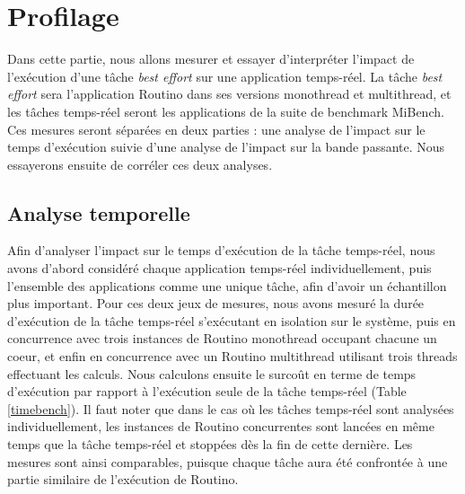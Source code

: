 \section{Profilage}

Dans cette partie, nous allons mesurer et essayer d'interpréter l'impact de 
l'exécution d'une tâche \textit{best effort} sur une application temps-réel.
La tâche \textit{best effort} sera l'application Routino dans ses versions
monothread et multithread, et les tâches temps-réel seront les applications de
la suite de benchmark MiBench\cite{guthaus_mibench:_2001}. Ces mesures seront
séparées en deux parties : une analyse de l'impact sur le temps d'exécution
suivie d'une analyse de l'impact sur la bande passante. Nous essayerons ensuite
de corréler ces deux analyses.

\subsection{Analyse temporelle}
Afin d'analyser l'impact sur le temps d'exécution de la tâche temps-réel, nous
avons d'abord considéré chaque application temps-réel individuellement, puis
l'ensemble des applications comme une unique tâche, afin d'avoir un échantillon
plus important. Pour ces deux jeux de mesures, nous avons mesuré la durée 
d'exécution de la tâche temps-réel s'exécutant en isolation sur le système,
puis en concurrence avec trois instances de Routino monothread occupant
chacune un coeur, et enfin en concurrence avec un Routino multithread utilisant
trois threads effectuant les calculs. Nous calculons ensuite le surcoût en
terme de temps d'exécution par rapport à l'exécution seule de la tâche
temps-réel (Table \ref{timebench}). Il faut noter que
dans le cas où les tâches temps-réel sont analysées individuellement, les 
instances de Routino concurrentes sont lancées en même temps que la tâche 
temps-réel et stoppées dès la fin de cette dernière. Les mesures sont ainsi
comparables, puisque chaque tâche aura été confrontée à une partie similaire 
de l'exécution de Routino.

